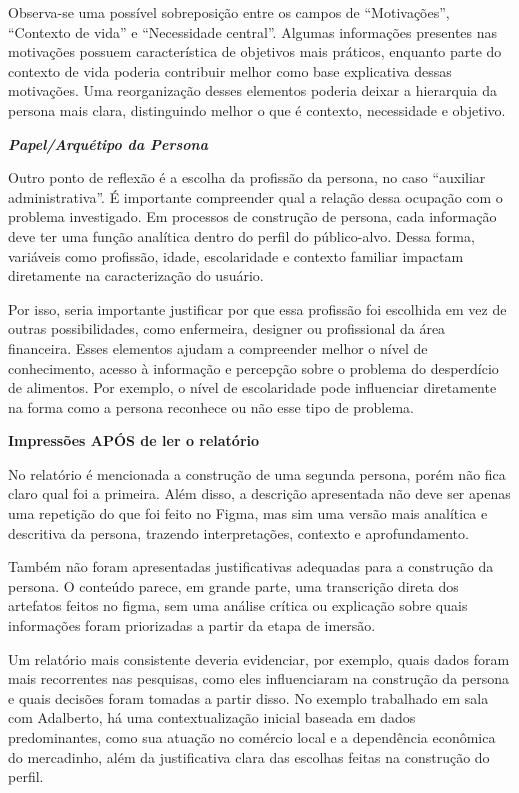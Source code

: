 \documentclass[
  sigconf,
  nonacm, %
  language=portuguese
]{acmart}
\begin{document}
Observa-se uma possível sobreposição entre os campos de “Motivações”, “Contexto de vida” e “Necessidade central”. Algumas informações presentes nas motivações possuem característica de objetivos mais práticos, enquanto parte do contexto de vida poderia contribuir melhor como base explicativa dessas motivações. Uma reorganização desses elementos poderia deixar a hierarquia da persona mais clara, distinguindo melhor o que é contexto, necessidade e objetivo.

\textit{\textbf{Papel/Arquétipo da Persona}}

Outro ponto de reflexão é a escolha da profissão da persona, no caso “auxiliar administrativa”. É importante compreender qual a relação dessa ocupação com o problema investigado. Em processos de construção de persona, cada informação deve ter uma função analítica dentro do perfil do público-alvo. Dessa forma, variáveis como profissão, idade, escolaridade e contexto familiar impactam diretamente na caracterização do usuário.

Por isso, seria importante justificar por que essa profissão foi escolhida em vez de outras possibilidades, como enfermeira, designer ou profissional da área financeira. Esses elementos ajudam a compreender melhor o nível de conhecimento, acesso à informação e percepção sobre o problema do desperdício de alimentos. Por exemplo, o nível de escolaridade pode influenciar diretamente na forma como a persona reconhece ou não esse tipo de problema.

\textbf{Impressões APÓS de ler o relatório}

No relatório é mencionada a construção de uma segunda persona, porém não fica claro qual foi a primeira. Além disso, a descrição apresentada não deve ser apenas uma repetição do que foi feito no Figma, mas sim uma versão mais analítica e descritiva da persona, trazendo interpretações, contexto e aprofundamento.

Também não foram apresentadas justificativas adequadas para a construção da persona. O conteúdo parece, em grande parte, uma transcrição direta dos artefatos feitos no figma, sem uma análise crítica ou explicação sobre quais informações foram priorizadas a partir da etapa de imersão.

Um relatório mais consistente deveria evidenciar, por exemplo, quais dados foram mais recorrentes nas pesquisas, como eles influenciaram na construção da persona e quais decisões foram tomadas a partir disso. No exemplo trabalhado em sala com Adalberto, há uma contextualização inicial baseada em dados predominantes, como sua atuação no comércio local e a dependência econômica do mercadinho, além da justificativa clara das escolhas feitas na construção do perfil.
\end{document}
